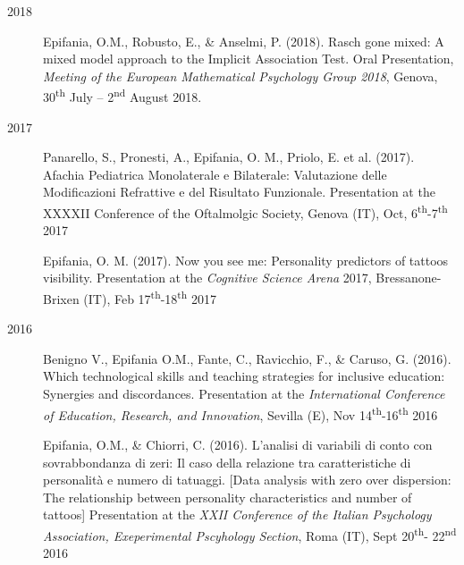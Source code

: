 \documentclass[letterpaper,12pt]{article}
\begin{document}
\begin{description}
	\item[2018] 
	\item[] 	Epifania, O.M., Robusto, E., \& Anselmi, P. (2018). Rasch gone mixed: A mixed model approach to the Implicit Association Test. Oral Presentation, \emph{Meeting of the European Mathematical Psychology Group 2018}, Genova, 30\textsuperscript{th} July – 2\textsuperscript{nd} August 2018.
	
		\item[2017] 
	\item[] 	Panarello, S., Pronesti, A., Epifania, O. M., Priolo, E. et al. (2017). Afachia Pediatrica Monolaterale e Bilaterale: Valutazione delle Modificazioni Refrattive e del Risultato Funzionale. Presentation at the XXXXII Conference of the Oftalmolgic Society, Genova (IT), Oct, 6\textsuperscript{th}-7\textsuperscript{th} 2017
	
	\item[] 	Epifania, O. M. (2017). Now you see me: Personality predictors of tattoos visibility. Presentation at the \emph{Cognitive Science Arena} 2017, Bressanone-Brixen (IT), Feb 17\textsuperscript{th}-18\textsuperscript{th} 2017
	
		\item[2016] 
	\item[] 	Benigno V., Epifania O.M., Fante, C., Ravicchio, F., \& Caruso, G. (2016). Which technological skills and teaching strategies for inclusive education: Synergies and discordances. Presentation at the \emph{International Conference of Education, Research, and Innovation}, Sevilla (E), Nov  14\textsuperscript{th}-16\textsuperscript{th} 2016
	
	\item[] 	Epifania, O.M., \& Chiorri, C. (2016). L’analisi di variabili di conto con sovrabbondanza di zeri: Il caso della relazione tra caratteristiche di personalità e numero di tatuaggi. [Data analysis with zero over dispersion: The relationship between personality characteristics and number of tattoos] Presentation at the \emph{XXII Conference of the Italian Psychology Association, Exeperimental Pscyhology Section}, Roma (IT), Sept 20\textsuperscript{th}- 22\textsuperscript{nd} 2016
	
\end{description}
\end{document}
